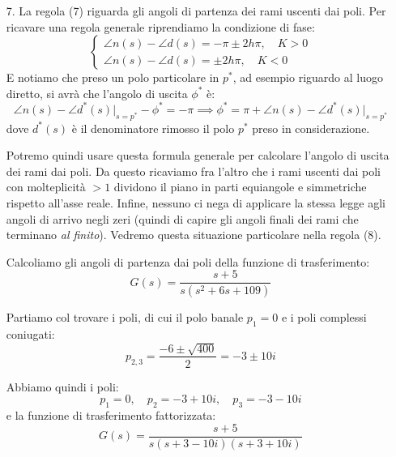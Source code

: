 \documentclass[a4paper,11pt]{article}
\begin{document}
\begin{enumerate}
	\item[7.] La regola (7) riguarda gli angoli di partenza dei rami uscenti dai poli.
		Per ricavare una regola generale riprendiamo la condizione di fase:
		\[
			\begin{cases}
				\angle n(s) - \angle d(s) = -\pi \pm 2 h \pi, \quad K > 0 \\
				\angle n(s) - \angle d(s) = \pm 2 h \pi, \quad K < 0
			\end{cases}
		\]
		E notiamo che preso un polo particolare in $p^*$, ad esempio riguardo al luogo diretto, si avrà che l'angolo di uscita $\phi^*$ è:
		$$
		\angle n(s) - \angle d^*(s) \Big|_{s = p^*} - \phi^* = -\pi \implies \phi^* = \pi + \angle n(s) - \angle d^*(s) \Big|_{s = p^*}
		$$
		dove $d^*(s)$ è il denominatore rimosso il polo $p^*$ preso in considerazione.

		Potremo quindi usare questa formula generale per calcolare l'angolo di uscita dei rami dai poli.
		Da questo ricaviamo fra l'altro che i rami uscenti dai poli con molteplicità $> 1$ dividono il piano in parti equiangole e simmetriche rispetto all'asse reale.
		Infine, nessuno ci nega di applicare la stessa legge agli angoli di arrivo negli zeri (quindi di capire gli angoli finali dei rami che terminano \textit{al finito}).
		Vedremo questa situazione particolare nella regola (8).

		\par\medskip
		\noindent
		\textbf{}

		Calcoliamo gli angoli di partenza dai poli della funzione di trasferimento:
		$$
		G(s) = \frac{s + 5}{s (s^2 + 6s + 109)}
		$$
		
		Partiamo col trovare i poli, di cui il polo banale $p_1 = 0$ e i poli complessi coniugati:
		$$
		p_{2, 3} = \frac{-6 \pm \sqrt{400}}{2} = -3 \pm 10i
		$$
		
		Abbiamo quindi i poli:
		$$
			p_1 = 0, \quad p_2 = -3 + 10 i, \quad p_3 = -3 - 10 i
		$$
		e la funzione di trasferimento fattorizzata:
		$$
		G(s) = \frac{s + 5}{s(s + 3 - 10i)(s + 3 + 10i)}
		$$


\end{enumerate}
\end{document}
